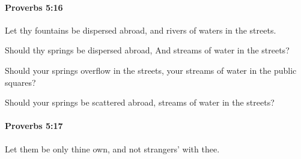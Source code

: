 		\paragraph{Proverbs 5:16} %
			\label{PROVERBS-5-16}

			Let thy fountains be dispersed abroad, and rivers of waters in the streets.

			\begin{versebox}
					\item[BHS] 
					\item[ASV] Should thy springs be dispersed abroad, And streams of water in the streets?
					\item[NIV] Should your springs overflow in the streets, your streams of water in the public squares?
					\item[NRSV] Should your springs be scattered abroad, streams of water in the streets?
			\end{versebox}

		\paragraph{Proverbs 5:17} %
			\label{PROVERBS-5-17}

			Let them be only thine own, and not strangers’ with thee.


